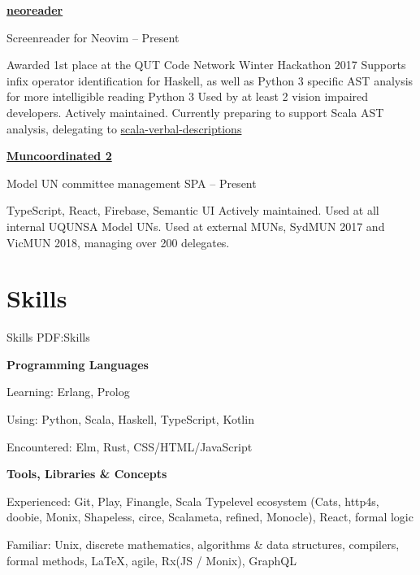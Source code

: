 \documentclass[a4paper,10pt,oneside]{article}
\begin{document}
\begin{body}
\href{https://github.com/MaxwellBo/neoreader}{\textbf{neoreader}} 
\par Screenreader for Neovim\hfill {} -- Present
\begin{detail}
	\BulletItem Awarded 1st place at the QUT Code Network Winter Hackathon 2017
	\BulletItem Supports infix operator identification for Haskell, as well as Python 3 specific AST analysis for more intelligible reading
	\BulletItem Python 3
	\BulletItem Used by at least 2 vision impaired developers. Actively maintained. Currently preparing to support Scala AST analysis, delegating to \href{https://github.com/MaxwellBo/scala-verbal-descriptions}{scala-verbal-descriptions}
\end{detail}


\EntryGap

\href{https://github.com/MaxwellBo/Muncoordinated-2}{\textbf{Muncoordinated 2}}
\par Model UN committee management SPA\hfill {} -- Present
\begin{detail}
	\BulletItem TypeScript, React, Firebase, Semantic UI
	\BulletItem Actively maintained. Used at all internal UQUNSA Model UNs. Used at external MUNs, SydMUN 2017 and VicMUN 2018, managing over 200 delegates.
\end{detail}


\section
{Skills}
{Skills}
{PDF:Skills}

\textbf{Programming Languages}
\par Learning: Erlang, Prolog
\par Using: Python, Scala, Haskell, TypeScript, Kotlin
\par Encountered: Elm, Rust, CSS/HTML/JavaScript

\EntryGap

\textbf{Tools, Libraries \& Concepts}
\par Experienced: Git, Play, Finangle, Scala Typelevel ecosystem (Cats, http4s, doobie, Monix, Shapeless, circe, Scalameta, refined, Monocle), React, formal logic
\par Familiar: Unix, discrete mathematics, algorithms \& data structures, compilers, formal methods, \LaTeX, agile, Rx(JS / Monix), GraphQL


\end{body}
\end{document}
